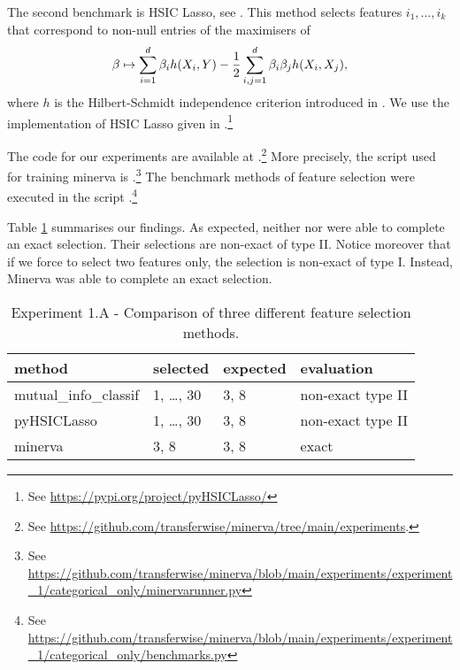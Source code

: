 The second benchmark is
HSIC Lasso,
see 
\cite{YJSXS14hig}.
This method 
selects features $i_1, \dots, i_k$
that correspond to non-null entries of the 
maximisers of 
\begin{equation*}
	\beta \mapsto 
	\sum_{i=1}^{d} \beta_i h(X_i, Y)
	-\frac{1}{2}
	\sum_{i,j = 1}^{d} \beta_i \beta_j h(X_i, X_j),
\end{equation*}
where $h$ is the Hilbert-Schmidt independence criterion 
introduced in 
\cite{GBSS05mea}.
We use the implementation of HSIC Lasso
given in
.\footnote{
See \url{https://pypi.org/project/pyHSICLasso/}
}

The code for our experiments are available 
at
.\footnote{
	See
\url{https://github.com/transferwise/minerva/tree/main/experiments}. 
}
More precisely, 
the script used for training minerva is
.\footnote{
	See
\url{https://github.com/transferwise/minerva/blob/main/experiments/experiment\_1/categorical\_only/minervarunner.py}
}
The benchmark methods of feature selection 
were
executed
in the script
.\footnote{
	See
\url{https://github.com/transferwise/minerva/blob/main/experiments/experiment\_1/categorical\_only/benchmarks.py}
}


Table
\ref{tab.experiment1A}
summarises our findings. 
As expected, 
neither 
nor
were able to complete an exact selection. 
Their selections are non-exact of type II. 
Notice moreover that if we force 
to select two features only,
the selection is non-exact of type I.
Instead,
Minerva
was able to complete an exact selection.

\begin{table}
	\centering
{
	\begin{tabular}{l|l|l|l}
		\textbf{method}
		&
		\textbf{selected}
		&
		\textbf{expected}
		&
		\textbf{evaluation}
		\\
		\hline
		mutual\_info\_classif
		&
		1, \dots, 30
		& 
		3, 8
		&
		non-exact type II
		\\
		pyHSICLasso
		&
		1, \dots, 30
		& 
		3, 8
		&
		non-exact type II
		\\
		minerva
		& 
		3, 8
		&
		3, 8
		&
		exact
	\end{tabular}
}
\caption{Experiment 1.A - Comparison of three different feature selection methods.}
\label{tab.experiment1A}
\end{table}






